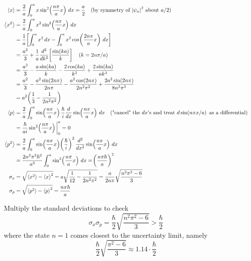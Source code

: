 \documentclass[a4paper]{article}
\begin{document}
\begin{align*}
\braket{x} & = \frac{2}{a}\int^{a}_{0} x \sin^{2}\!\left(\frac{n \pi}{a}x\right) \, dx  = \frac{a}{2} \quad (\text{by symmetry of } \abs{\psi_{n}}^{2} \text{ about } a/2) \\
	\braket{x^{2}} & = \frac{2}{a}\int^{a}_{0} x^{2}\sin^{2}\!\left(\frac{n \pi}{a}x\right) \, dx \\
		       & = \frac{1}{a}\!\left[ \int^{a}_{0} x^{2} \, dx - \int^{a}_{0} x^{2}\cos\!\left(\frac{2n \pi}{a}x\right) \, dx \right] \\
		       & = \frac{a^{2}}{3} + \frac{1}{a}\frac{d^2 }{d k^2}\!\left[ \frac{\sin\!\left(ka\right)}{k} \right] \quad (k = 2n \pi / a) \\
		       & = \frac{a^{2}}{3} - \frac{a\sin\!\left(ka\right)}{k} - \frac{2 \cos\!\left(ka\right)}{k^{2}} + \frac{2 \sin\!\left(ka\right)}{ak^{3}} \\
		       & = \frac{a^{2}}{3} - \frac{a^{2}\sin\!\left(2n \pi\right)}{2n \pi} - \frac{a^{2} \cos\!\left(2n \pi\right)}{2n^{2}\pi^{2}} + \frac{2a^{2} \sin\!\left(2n \pi\right)}{8n^{3}\pi^{3}} \\
		       & = a^{2}\!\left( \frac{1}{3} - \frac{1}{2n^{2}\pi^{2}} \right) \\
	    \braket{p} & = \frac{2}{a}\int^{a}_{0} \sin\!\left(\frac{n \pi}{a}x\right)\frac{\hbar}{i}\frac{d }{d x}\sin\!\left(\frac{n \pi}{a}x\right) \, dx \quad (\text{"cancel" the } dx \text{'s and treat } d \sin\!\left(n \pi x / a\right) \text{ as a differential}) \\
		       & = \frac{\hbar}{ai}\sin^{2}\!\left(\frac{n \pi}{a}x\right)\bigg|^{a}_{0} = 0 \\
	\braket{p^{2}} & = \frac{2}{a}\int^{a}_{0} \sin\!\left(\frac{n \pi}{a}x\right)\!\left( \frac{\hbar}{i} \right)^{2}\frac{d^2 }{d x^2}\sin\!\left(\frac{n \pi}{a}x\right) \, dx \\
		       & = \frac{2n^{2}\pi^{2} \hbar^{2}}{a^{3}}\int^{a}_{0} \sin^{2}\!\left(\frac{n \pi}{a}x\right) \, dx = \!\left( \frac{n \pi \hbar}{a} \right)^{2} \\
	\sigma_{x} & = \sqrt{\braket{x^{2}} - \braket{x}^{2}} = a \sqrt{\frac{1}{12} - \frac{1}{2n^{2}\pi^{2}}} = \frac{a}{2n \pi}\sqrt{\frac{n^{2}\pi^{2} - 6}{3}} \\
	    \sigma_{p} & = \sqrt{\braket{p^{2}} - \braket{p}^{2}} = \frac{n \pi \hbar}{a}
\end{align*}

Multiply the standard deviations to check
\[
	\sigma_{x}\sigma_{p} = \frac{\hbar}{2}\sqrt{\frac{n^{2}\pi^{2} - 6}{3}} > \frac{\hbar}{2}
\]
where the state \( n = 1 \) comes closest to the uncertainty limit, namely 
\[
	\frac{\hbar}{2}\sqrt{\frac{\pi^{2} - 6}{3}} \approx 1.14 \cdot \frac{\hbar}{2} 
\]
\end{document}
